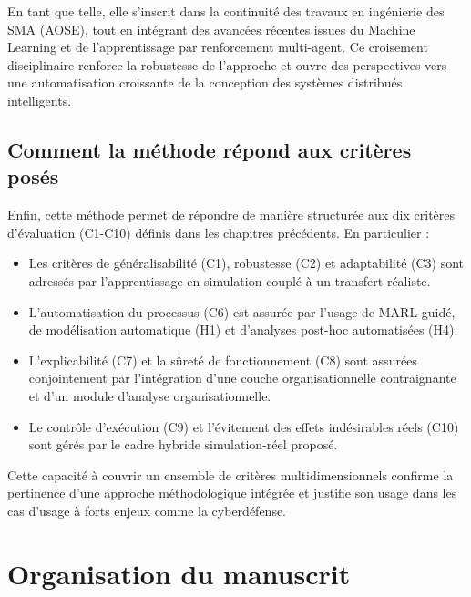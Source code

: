 \documentclass[ twoside,openright,titlepage,numbers=noenddot,headinclude,%
                footinclude=true,cleardoublepage=empty,abstractoff, %
                BCOR=5mm,paper=a4,fontsize=11pt,%
                french,american,%
                ]{scrreprt}
\begin{document}
En tant que telle, elle s'inscrit dans la continuité des travaux en ingénierie des SMA (AOSE), tout en intégrant des avancées récentes issues du Machine Learning et de l'apprentissage par renforcement multi-agent. Ce croisement disciplinaire renforce la robustesse de l'approche et ouvre des perspectives vers une automatisation croissante de la conception des systèmes distribués intelligents.

\subsection{Comment la méthode répond aux critères posés}

Enfin, cette méthode permet de répondre de manière structurée aux dix critères d'évaluation (C1-C10) définis dans les chapitres précédents. En particulier :

\begin{itemize}
    \item Les critères de généralisabilité (C1), robustesse (C2) et adaptabilité (C3) sont adressés par l'apprentissage en simulation couplé à un transfert réaliste.
    \item L'automatisation du processus (C6) est assurée par l'usage de MARL guidé, de modélisation automatique (H1) et d'analyses post-hoc automatisées (H4).
    \item L'explicabilité (C7) et la sûreté de fonctionnement (C8) sont assurées conjointement par l'intégration d'une couche organisationnelle contraignante et d'un module d'analyse organisationnelle.
    \item Le contrôle d'exécution (C9) et l'évitement des effets indésirables réels (C10) sont gérés par le cadre hybride simulation-réel proposé.
\end{itemize}

Cette capacité à couvrir un ensemble de critères multidimensionnels confirme la pertinence d'une approche méthodologique intégrée et justifie son usage dans les cas d'usage à forts enjeux comme la cyberdéfense.


\section{Organisation du manuscrit}\label{sec:manuscrit-structure}
\end{document}
